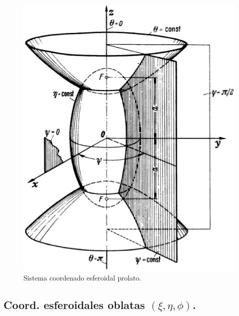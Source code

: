 \documentclass[12pt]{article}
\numberwithin{equation}{section}
\begin{document}
\begin{figure}[H]
  \centering
  \includegraphics[scale=0.5]{Imagenes/Sistema_Esfeoridal_Prolato.eps}
  \caption{Sistema coordenado esferoidal prolato.}
\end{figure}

\subsection{Coord. esferoidales oblatas \texorpdfstring{$(\xi, \eta, \phi)$}{(x,e, f)}.}
\end{document}
